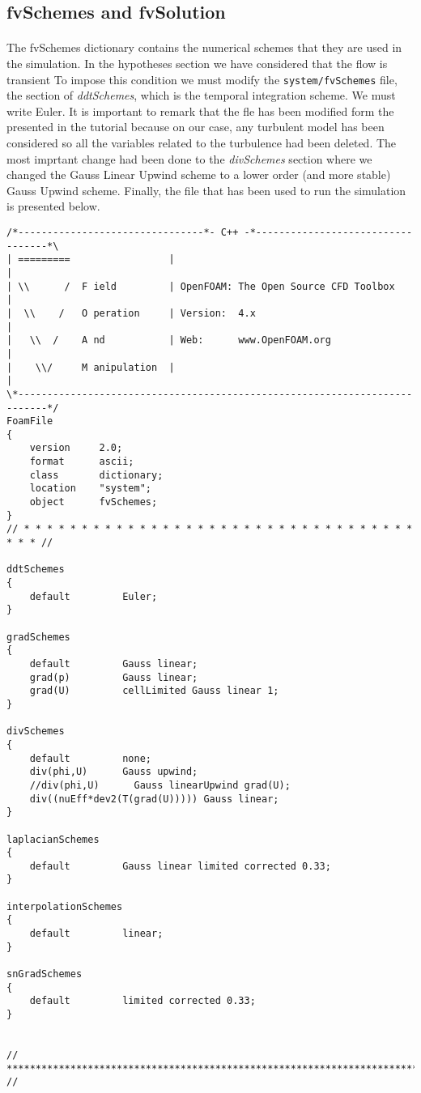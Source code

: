 \subsection{fvSchemes and fvSolution}
\paragraph{}
The fvSchemes dictionary contains the numerical schemes that they are used in the simulation. In the hypotheses section we have considered that the flow is transient To impose this condition we must modify the \texttt{system/fvSchemes} file, the section of \textit{ddtSchemes}, which is the temporal integration scheme. We must write Euler. It is important to remark that the fle has been modified form the presented in the tutorial because on our case, any turbulent model has been considered so all the variables related to the turbulence had been deleted. The most imprtant change had been done to the \textit{divSchemes} section where we changed the Gauss Linear Upwind scheme to a lower order (and more stable) Gauss Upwind scheme. Finally, the file that has been used to run the simulation is presented below.

\begin{footnotesize}
\begin{verbatim}
/*--------------------------------*- C++ -*----------------------------------*\
| =========                 |                                                 |
| \\      /  F ield         | OpenFOAM: The Open Source CFD Toolbox           |
|  \\    /   O peration     | Version:  4.x                                   |
|   \\  /    A nd           | Web:      www.OpenFOAM.org                      |
|    \\/     M anipulation  |                                                 |
\*---------------------------------------------------------------------------*/
FoamFile
{
    version     2.0;
    format      ascii;
    class       dictionary;
    location    "system";
    object      fvSchemes;
}
// * * * * * * * * * * * * * * * * * * * * * * * * * * * * * * * * * * * * * //

ddtSchemes
{
    default         Euler;
}

gradSchemes
{
    default         Gauss linear;
    grad(p)         Gauss linear;
    grad(U)         cellLimited Gauss linear 1;
}

divSchemes
{
    default         none;
    div(phi,U)      Gauss upwind;
    //div(phi,U)      Gauss linearUpwind grad(U);
    div((nuEff*dev2(T(grad(U))))) Gauss linear;
}

laplacianSchemes
{
    default         Gauss linear limited corrected 0.33;
}

interpolationSchemes
{
    default         linear;
}

snGradSchemes
{
    default         limited corrected 0.33;
}


// ************************************************************************* //

\end{verbatim}
\end{footnotesize}


